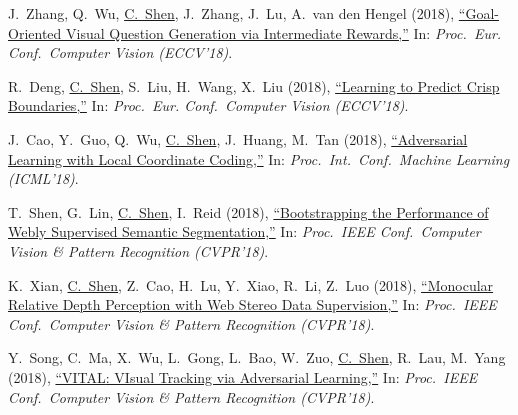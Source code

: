 \documentclass[9pt, a4paper]{article}
\newcommand{\years}[1]{\marginnote{\scriptsize #1}}
\def\highlight{\uline}
\begin{document}
\medskip

\years{2018} J.~Zhang, Q.~Wu, \highlight{C.~Shen}, J.~Zhang, J.~Lu, A.~van den Hengel (2018),
\href{http://www.google.com/search?lr=&ie=UTF-8&oe=UTF-8&q=Goal-Oriented+Visual+Question+Generation+via+Intermediate+Rewards+Junjie+Zhang%2C+Qi+Wu%2C+Chunhua+Shen%2C+Jian+Zhang%2C+Jianfeng+Lu%2C+Anton+van+den+Hengel}{``Goal-Oriented Visual Question Generation via Intermediate Rewards,{}''}
In: \emph{Proc.\ Eur. Conf.\  Computer Vision (ECCV'18)}.

\medskip

\years{2018} R.~Deng, \highlight{C.~Shen}, S.~Liu, H.~Wang, X.~Liu (2018),
\href{http://www.google.com/search?lr=&ie=UTF-8&oe=UTF-8&q=Learning+to+Predict+Crisp+Boundaries+Ruoxi+Deng%2C+Chunhua+Shen%2C+Shengjun+Liu%2C+Huibing+Wang%2C+Xinru+Liu}{``Learning to Predict Crisp Boundaries,{}''}
In: \emph{Proc.\ Eur. Conf.\  Computer Vision (ECCV'18)}.

\medskip

\years{2018} J.~Cao, Y.~Guo, Q.~Wu, \highlight{C.~Shen}, J.~Huang, M.~Tan (2018),
\href{http://www.google.com/search?lr=&ie=UTF-8&oe=UTF-8&q=Adversarial+Learning+with+Local+Coordinate+Coding+Jiezhang++Cao%2C+Yong++Guo%2C+Qingyao+Wu%2C+Chunhua+Shen%2C+Junzhou++Huang%2C+Mingkui++Tan}{``Adversarial Learning with Local Coordinate Coding,{}''}
In: \emph{Proc.\ Int.\ Conf.\  Machine Learning (ICML'18)}.

\medskip

\years{2018} T.~Shen, G.~Lin, \highlight{C.~Shen}, I.~Reid (2018),
\href{http://www.google.com/search?lr=&ie=UTF-8&oe=UTF-8&q=Bootstrapping+the+Performance+of+Webly+Supervised+Semantic+Segmentation+Tong+Shen%2C+Guosheng+Lin%2C+Chunhua+Shen%2C+Ian+Reid}{``Bootstrapping the Performance of Webly Supervised Semantic Segmentation,{}''}
In: \emph{Proc.\ IEEE Conf.\  Computer Vision \& Pattern Recognition (CVPR'18)}.

\medskip

\years{2018} K.~Xian, \highlight{C.~Shen}, Z.~Cao, H.~Lu, Y.~Xiao, R.~Li, Z.~Luo (2018),
\href{http://www.google.com/search?lr=&ie=UTF-8&oe=UTF-8&q=Monocular+Relative+Depth+Perception+with+Web+Stereo+Data+Supervision+Ke+Xian%2C+Chunhua+Shen%2C+Zhiguo+Cao%2C+Hao+Lu%2C+Yang+Xiao%2C+Ruibo+Li%2C+Zhenbo++Luo}{``Monocular Relative Depth Perception with Web Stereo Data Supervision,{}''}
In: \emph{Proc.\ IEEE Conf.\  Computer Vision \& Pattern Recognition (CVPR'18)}.

\medskip

\years{2018} Y.~Song, C.~Ma, X.~Wu, L.~Gong, L.~Bao, W.~Zuo, \highlight{C.~Shen}, R.~Lau, M.~Yang (2018),
\href{http://www.google.com/search?lr=&ie=UTF-8&oe=UTF-8&q=VITAL%3A+VIsual+Tracking+via+Adversarial+Learning+Yibing+Song%2C+Chao+Ma%2C+Xiaohe+Wu%2C+Lijun+Gong%2C+Linchao+Bao%2C+Wangmeng+Zuo%2C+Chunhua+Shen%2C+Rynson+Lau%2C+Ming-Hsuan+Yang}{``{VITAL}: VIsual Tracking via Adversarial Learning,{}''}
In: \emph{Proc.\ IEEE Conf.\  Computer Vision \& Pattern Recognition (CVPR'18)}.
\end{document}
